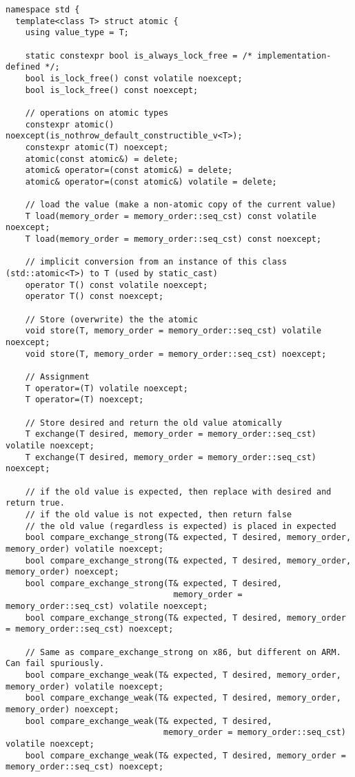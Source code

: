 \begin{verbatim}
namespace std {
  template<class T> struct atomic {
    using value_type = T;
  
    static constexpr bool is_always_lock_free = /* implementation-defined */;
    bool is_lock_free() const volatile noexcept;
    bool is_lock_free() const noexcept;
  
    // operations on atomic types
    constexpr atomic() noexcept(is_nothrow_default_constructible_v<T>);
    constexpr atomic(T) noexcept;
    atomic(const atomic&) = delete;
    atomic& operator=(const atomic&) = delete;
    atomic& operator=(const atomic&) volatile = delete;
  
    // load the value (make a non-atomic copy of the current value)
    T load(memory_order = memory_order::seq_cst) const volatile noexcept;
    T load(memory_order = memory_order::seq_cst) const noexcept;

    // implicit conversion from an instance of this class (std::atomic<T>) to T (used by static_cast)
    operator T() const volatile noexcept;
    operator T() const noexcept;

    // Store (overwrite) the the atomic
    void store(T, memory_order = memory_order::seq_cst) volatile noexcept;
    void store(T, memory_order = memory_order::seq_cst) noexcept;

    // Assignment 
    T operator=(T) volatile noexcept;
    T operator=(T) noexcept;
    
    // Store desired and return the old value atomically
    T exchange(T desired, memory_order = memory_order::seq_cst) volatile noexcept;
    T exchange(T desired, memory_order = memory_order::seq_cst) noexcept;

    // if the old value is expected, then replace with desired and return true.
    // if the old value is not expected, then return false
    // the old value (regardless is expected) is placed in expected
    bool compare_exchange_strong(T& expected, T desired, memory_order, memory_order) volatile noexcept;
    bool compare_exchange_strong(T& expected, T desired, memory_order, memory_order) noexcept;
    bool compare_exchange_strong(T& expected, T desired,
                                  memory_order = memory_order::seq_cst) volatile noexcept;
    bool compare_exchange_strong(T& expected, T desired, memory_order = memory_order::seq_cst) noexcept;

    // Same as compare_exchange_strong on x86, but different on ARM. Can fail spuriously.
    bool compare_exchange_weak(T& expected, T desired, memory_order, memory_order) volatile noexcept;
    bool compare_exchange_weak(T& expected, T desired, memory_order, memory_order) noexcept;
    bool compare_exchange_weak(T& expected, T desired,
                                memory_order = memory_order::seq_cst) volatile noexcept;
    bool compare_exchange_weak(T& expected, T desired, memory_order = memory_order::seq_cst) noexcept;
  

\end{verbatim}
